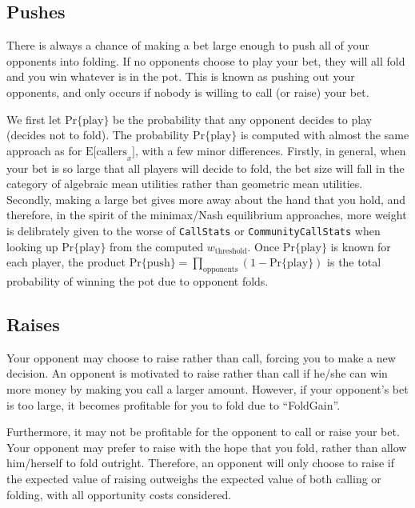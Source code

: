 \subsection{Pushes}
\label{sec:Push}
There is always a chance of making a bet large enough to push all of your opponents into folding.
If no opponents choose to play your bet, they will all fold and you win whatever is in the pot.
This is known as pushing out your opponents, and only occurs if nobody is willing to call (or raise) your bet.

We first let $\mathrm{Pr\{play\}}$ be the probability that any opponent decides to play (decides not to fold).
The probability $\mathrm{Pr\{play\}}$ is computed with almost the same approach as for $\mathrm{E[callers}_x]$, with a few minor differences.
Firstly, in general, when your bet is so large that all players will decide to fold, the bet size will fall in the category of algebraic mean utilities rather than geometric mean utilities.
Secondly, making a large bet gives more away about the hand that you hold, and therefore, in the spirit of the minimax/Nash equilibrium approaches, more weight is delibrately given to the worse of \texttt{CallStats} or \texttt{CommunityCallStats} when looking up $\mathrm{Pr\{play\}}$ from the computed $w_\mathrm{threshold}$.
Once $\mathrm{Pr\{play\}}$ is known for each player, the product $\mathrm{Pr\{push\}} = \prod_\mathrm{opponents} \left( 1 - \mathrm{Pr\{play\}} \right)$ is the total probability of winning the pot due to opponent folds.



\subsection{Raises}
\label{sec:Raises}
Your opponent may choose to raise rather than call, forcing you to make a new decision.
An opponent is motivated to raise rather than call if he/she can win more money by making you call a larger amount.
However, if your opponent's bet is too large, it becomes profitable for you to fold due to ``FoldGain''.

Furthermore, it may not be profitable for the opponent to call or raise your bet.
Your opponent may prefer to raise with the hope that you fold, rather than allow him/herself to fold outright.
Therefore, an opponent will only choose to raise if the expected value of raising outweighs the expected value of both calling or folding, with all opportunity costs considered.


